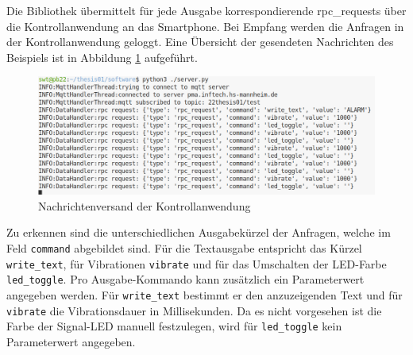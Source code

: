 \documentclass[11pt,a4paper]{report}
\begin{document}
Die Bibliothek übermittelt für jede Ausgabe korrespondierende rpc\_requests über die Kontrollanwendung an das Smartphone.
Bei Empfang werden die Anfragen in der Kontrollanwendung geloggt.
Eine Übersicht der gesendeten Nachrichten des Beispiels ist in Abbildung \ref{fig:req_controll_app} aufgeführt.
\begin{figure}[htbp]
  \centering
  \includegraphics[width=\textwidth]{images/server_requests}
  \caption{Nachrichtenversand der Kontrollanwendung}
  \label{fig:req_controll_app}
\end{figure}
Zu erkennen sind die unterschiedlichen Ausgabekürzel der Anfragen, welche im Feld \texttt{command} abgebildet sind.
Für die Textausgabe entspricht das Kürzel \texttt{write\_text}, für Vibrationen \texttt{vibrate} und für das Umschalten der LED-Farbe \texttt{led\_toggle}.
Pro Ausgabe-Kommando kann zusätzlich ein Parameterwert angegeben werden.
Für \texttt{write\_text} bestimmt er den anzuzeigenden Text und für \texttt{vibrate} die Vibrationsdauer in Millisekunden.
Da es nicht vorgesehen ist die Farbe der Signal-LED manuell festzulegen, wird für \texttt{led\_toggle} kein Parameterwert angegeben.
\end{document}
